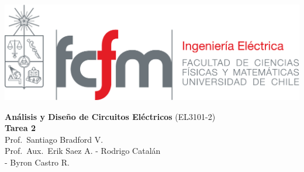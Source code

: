 \documentclass[
  11pt,
  letterpaper,
   addpoints,
  ]{exam}
\begin{document}
\noindent
\begin{minipage}{0.47\textwidth}
\includegraphics[width=\textwidth]{../fcfm_die}
\end{minipage}
\begin{minipage}{0.53\textwidth}
    
\begin{center} 
\large\textbf{Análisis y Diseño de Circuitos Eléctricos} (EL3101-2) \\
\large\textbf{Tarea 2} \\
\normalsize Prof.~Santiago Bradford V.\\
\normalsize Prof.~Aux.~Erik Saez A. - Rodrigo Catalán\\
             - Byron Castro R.
\end{center}
\end{minipage}

\vspace{0.5cm}
\noindent
\vspace{.85cm}

\end{document}
